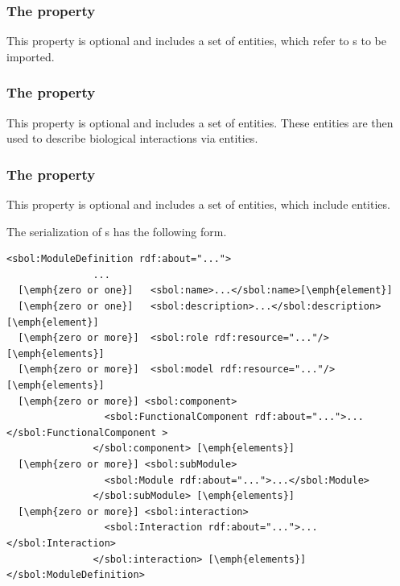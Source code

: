 
\subsubsection*{The  property}
This property is optional and includes a set of  entities, which refer to s to be imported.

\subsubsection*{The  property}
This property is optional and includes a set of  entities. These entities are then used to describe biological interactions via  entities.

\subsubsection*{The  property}
This property is optional and includes a set of  entities, which include  entities.

The serialization of s has the following form.
\begin{lstlisting}
<sbol:ModuleDefinition rdf:about="...">
               ...
  [\emph{zero or one}]   <sbol:name>...</sbol:name>[\emph{element}]
  [\emph{zero or one}]   <sbol:description>...</sbol:description>[\emph{element}]
  [\emph{zero or more}]  <sbol:role rdf:resource="..."/>[\emph{elements}]
  [\emph{zero or more}]  <sbol:model rdf:resource="..."/>[\emph{elements}]
  [\emph{zero or more}] <sbol:component>
                 <sbol:FunctionalComponent rdf:about="...">...</sbol:FunctionalComponent >
               </sbol:component> [\emph{elements}]
  [\emph{zero or more}] <sbol:subModule>
                 <sbol:Module rdf:about="...">...</sbol:Module>
               </sbol:subModule> [\emph{elements}]
  [\emph{zero or more}] <sbol:interaction>
                 <sbol:Interaction rdf:about="...">...</sbol:Interaction>
               </sbol:interaction> [\emph{elements}]
</sbol:ModuleDefinition>
\end{lstlisting}


